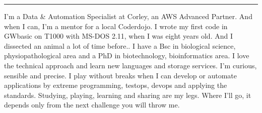 \documentclass[9pt]{stackoverflow-upgraded-version} %
\begin{document}


\textcolor{stackoverflow}{\hrule}
\vspace{\baselineskip} %

\begin{minipage}[t]{0.45\textwidth} %
	\vspace{-\baselineskip} %
	I'm a Data \& Automation Specialist at Corley, an AWS Advanced Partner. And when I can, I'm a mentor for a local Coderdojo.
	I wrote my first code in GWbasic on T1000 with MS-DOS 2.11, when I was eight years old. And I dissected an animal a lot of time before..
	I have a Bsc in biological science, physiopathological area and a PhD in biotechnology, bioinformatics area.
	I love the technical approach and learn new languages and storage services. I'm curious, sensible and precise.
	I play without breaks when I can develop or automate applications by extreme programming, testops, devops and applying the standards.
	Studying, playing, learning and sharing are my legs. Where I'll go, it depends only from the next challenge you will throw me.
	\\
\end{minipage}
\hfill %
\begin{minipage}[t]{0.5\textwidth} %
	\vspace{-26pt} %
	\begin{barchart}{5.5}
	\end{barchart}
\end{minipage}

\end{document}
